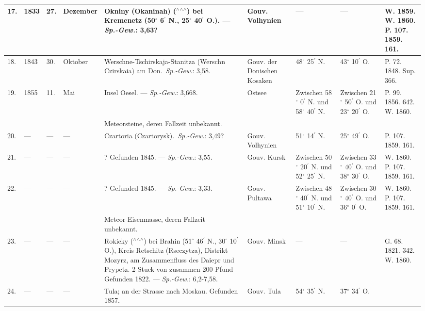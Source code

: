 \documentclass[a4paper, 8pt, oneside, polutonikogreek, german]{article}
\begin{document}
\begin{center}
\begin{longtable}{|p{3mm}|p{10mm}|p{5mm}|p{13mm}|p{25mm}|p{13mm}|p{10mm}|p{10mm}|p{11mm}|}
        17. & 1833 & 27. & Dezember & Okniny (Okaninah) ($^\wedge$$^\wedge$$^\wedge$) bei Kremenetz (50$^\circ$ 6$^\prime$ N., 25$^\circ$ 40$^\prime$ O.). --- \emph{Sp.-Gew.}: 3,63? & Gouv. Volhynien & --- & --- & W. 1859. W. 1860. P. 107. 1859. 161. \\ \hline
        18. & 1843 & 30. & Oktober & Werschne-Tschirskaja-Stanitza (Werschn Czirskaia) am Don. \emph{Sp.-Gew.}: 3,58. & Gouv. der Donischen Kosaken & 48$^\circ$ 25$^\prime$ N. & 43$^\circ$ 10$^\prime$ O. & P. 72. 1848. Sup. 366. \\ \hline
        19. & 1855 & 11. & Mai & Insel Oesel. --- \emph{Sp.-Gew.}: 3,668. & Ostsee & Zwischen 58$^\circ$ 0$^\prime$ N. und 58$^\circ$ 40$^\prime$ N. & Zwischen 21$^\circ$ 50$^\prime$ O. und 23$^\circ$ 20$^\prime$ O. & P. 99. 1856. 642. W. 1860. \\ \hline
          &   &   &   & Meteorsteine, deren Fallzeit unbekannt. &   &   &   &   \\ \hline
        20. & --- & --- & --- & Czartoria (Czartorysk). \emph{Sp.-Gew.}: 3,49? & Gouv. Volhynien & 51$^\circ$ 14$^\prime$ N. & 25$^\circ$ 49$^\prime$ O. & P. 107. 1859. 161. \\ \hline
        21. & --- & --- & --- & ? Gefunden 1845. --- \emph{Sp.-Gew.}: 3,55. & Gouv. Kursk & Zwischen 50$^\circ$ 20$^\prime$ N. und 52$^\circ$ 25$^\prime$ N. & Zwischen 33$^\circ$ 40$^\prime$ O. und 38$^\circ$ 30$^\prime$ O. & W. 1860. P. 107. 1859. 161. \\ \hline
        22. & --- & --- & --- & ? Gefunded 1845. --- \emph{Sp.-Gew.}: 3,33. & Gouv. Pultawa & Zwischen 48$^\circ$ 40$^\prime$ N. und 51$^\circ$ 10$^\prime$ N. & Zwischen 30$^\circ$ 40$^\prime$ O. und 36$^\circ$ 0$^\prime$ O. & W. 1860. P. 107. 1859. 161. \\ \hline
          &   &   &   & Meteor-Eisenmasse, deren Fallzeit unbekannt. &   &   &   &   \\ \hline
        23. & --- & --- & --- & Rokicky ($^\wedge$$^\wedge$$^\wedge$) bei Brahin (51$^\circ$ 46$^\prime$ N., 30$^\circ$ 10$^\prime$ O.), Kreis Retschitz (Rseczytza), Distrikt Mozyrz, am Zusammenfluss des Daiepr und Prypetz. 2 Stuck von zusammen 200 Pfund Gefunden 1822. --- \emph{Sp.-Gew.}: 6,2-7,58. & Gouv. Minsk & --- & --- & G. 68. 1821. 342. W. 1860. \\ \hline
        24. & --- & --- & --- & Tula; an der Strasse nach Moskau. Gefunden 1857. & Gouv. Tula & 54$^\circ$ 35$^\prime$ N. & 37$^\circ$ 34$^\prime$ O. & \\ \hline
    \end{longtable}
\end{center}
\clearpage
\end{document}
